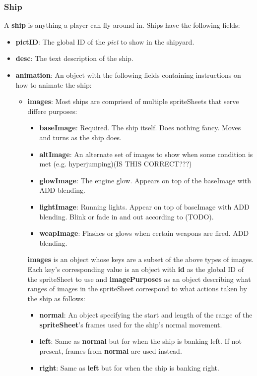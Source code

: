 \documentclass{article}
\begin{document}
\subsubsection{Ship}
A \textbf{ship} is anything a player can fly around in. Ships have the following fields:
\begin{itemize}
\item{\textbf{pictID}}: The global ID of the \emph{pict} to show in the shipyard.
\item{\textbf{desc}}: The text description of the ship.
\item{\textbf{animation}}: An object with the following fields containing instructions on how to animate the ship:
  \begin{itemize}
  \item{\textbf{images}}: Most ships are comprised of multiple spriteSheets that serve differe purposes:
    \begin{itemize}
    \item{\textbf{baseImage}}: Required. The ship itself. Does nothing fancy. Moves and turns as the ship does.
    \item{\textbf{altImage}}: An alternate set of images to show when some condition is met (e.g. hyperjumping)(IS THIS CORRECT???)
    \item{\textbf{glowImage}}: The engine glow. Appears on top of the baseImage with ADD blending.
    \item{\textbf{lightImage}}: Running lights. Appear on top of baseImage with ADD blending. Blink or fade in and out according to (TODO).
    \item{\textbf{weapImage}}:\label{weapImage} Flashes or glows when certain weapons are fired. ADD blending.
    \end{itemize}
    \textbf{images} is an object whose keys are a subset of the above types of images. Each key's corresponding value is an object with \textbf{id} as the global ID of the spriteSheet to use and \textbf{imagePurposes} as an object describing what ranges of images in the spriteSheet correspond to what actions taken by the ship as follows:
    \begin{itemize}
    \item{\textbf{normal}}: An object specifying the start and length of the range of the \textbf{spriteSheet}'s frames used for the ship's normal movement.
    \item{\textbf{left}}: Same as \textbf{normal} but for when the ship is banking left. If not present, frames from \textbf{normal} are used instead.
    \item{\textbf{right}}: Same as \textbf{left} but for when the ship is banking right.
    \end{itemize}


\end{itemize}
\end{itemize}
\end{document}

